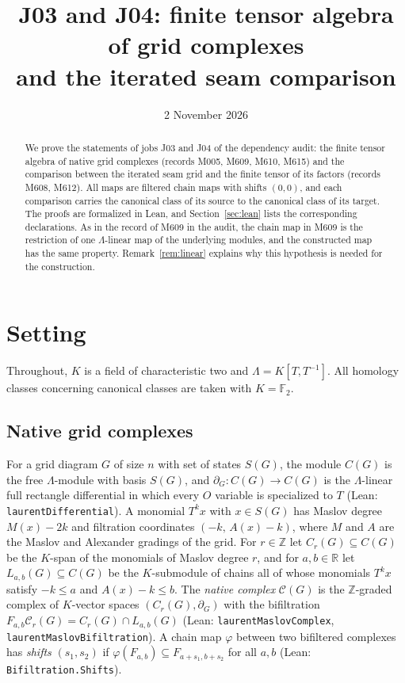 \documentclass[11pt]{amsart}
\title[J03 and J04: finite tensor algebra and the iterated seam]{J03 and J04: finite tensor
algebra of grid complexes\\ and the iterated seam comparison}
\date{2 November 2026}
\theoremstyle{definition}
\theoremstyle{remark}
\newcommand{\lean}[1]{\textnormal{\nolinkurl{#1}}}
\newcommand{\Lam}{\Lambda}
\newcommand{\F}{\mathbb{F}_2}
\newcommand{\cC}{\mathcal{C}}
\newcommand{\Lev}{L}
\begin{document}
\begin{abstract}
We prove the statements of jobs J03 and J04 of the dependency audit: the finite tensor algebra
of native grid complexes (records M005, M609, M610, M615) and the comparison between the iterated
seam grid and the finite tensor of its factors (records M608, M612). All maps are filtered chain
maps with shifts $(0,0)$, and each comparison carries the canonical class of its source to the
canonical class of its target. The proofs are formalized in Lean, and Section~\ref{sec:lean} lists
the corresponding declarations. As in the record of M609 in the audit, the chain map in M609 is
the restriction of one $\Lam$-linear map of the underlying modules, and the constructed map has the
same property. Remark~\ref{rem:linear} explains why this hypothesis is needed for the
construction.
\end{abstract}

\maketitle

\section{Setting}\label{sec:setting}

Throughout, $K$ is a field of characteristic two and $\Lam=K[T,T^{-1}]$. All homology classes
concerning canonical classes are taken with $K=\F$.

\subsection{Native grid complexes}
For a grid diagram $G$ of size $n$ with set of states $S(G)$, the module $C(G)$ is the free
$\Lam$-module with basis $S(G)$, and $\partial_G\colon C(G)\to C(G)$ is the $\Lam$-linear
full rectangle differential in which every $O$ variable is specialized to $T$ (Lean:
\lean{laurentDifferential}). A monomial $T^kx$ with $x\in S(G)$ has Maslov degree $M(x)-2k$ and
filtration coordinates $(-k,\,A(x)-k)$, where $M$ and $A$ are the Maslov and Alexander gradings of
the grid. For $r\in\mathbb{Z}$ let $C_r(G)\subseteq C(G)$ be the $K$-span of the monomials of
Maslov degree $r$, and for $a,b\in\mathbb{R}$ let $\Lev_{a,b}(G)\subseteq C(G)$ be the
$K$-submodule of chains all of whose monomials $T^kx$ satisfy $-k\le a$ and $A(x)-k\le b$. The
\emph{native complex} $\cC(G)$ is the $\mathbb{Z}$-graded complex of $K$-vector spaces
$(C_r(G),\partial_G)$ with the bifiltration $F_{a,b}\cC_r(G)=C_r(G)\cap\Lev_{a,b}(G)$ (Lean:
\lean{laurentMaslovComplex}, \lean{laurentMaslovBifiltration}). A chain map $\varphi$ between two
bifiltered complexes has \emph{shifts} $(s_1,s_2)$ if $\varphi(F_{a,b})\subseteq F_{a+s_1,b+s_2}$
for all $a,b$ (Lean: \lean{Bifiltration.Shifts}).
\end{document}
